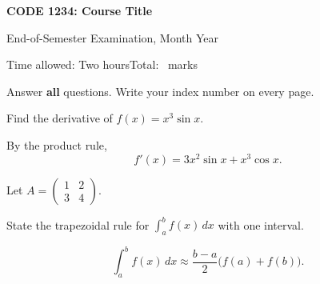 \documentclass[11pt,a4paper,addpoints]{exam}
\newcommand{\coursecode}{CODE 1234}%
\newcommand{\coursetitle}{Course Title}%
\newcommand{\examname}{End-of-Semester Examination, Month Year}%
\newcommand{\duration}{Two hours}%
\begin{document}
\begin{center}
  {\Large\bfseries \coursecode: \coursetitle\par}
  \medskip
  {\large \examname\par}
  \medskip
  Time allowed: \duration \hfill Total: \numpoints\ marks
\end{center}

\noindent Answer \textbf{all} questions.
Write your index number on every page.

\begin{center}
  \gradetable[h][questions]
\end{center}

\begin{questions}

  \question[10]
  Find the derivative of $f(x) = x^3 \sin x$.
  \begin{solution}
    By the product rule,
    \[
      f'(x) = 3x^2 \sin x + x^3 \cos x.
    \]
  \end{solution}

  \question
  Let $A = \begin{pmatrix} 1 & 2 \\ 3 & 4 \end{pmatrix}$.

  \question[5]
  State the trapezoidal rule for $\int_a^b f(x)\,dx$ with one interval.
  \begin{solution}
    \[
      \int_a^b f(x)\,dx \approx \frac{b - a}{2}\bigl(f(a) + f(b)\bigr).
    \]
  \end{solution}

\end{questions}
\end{document}
